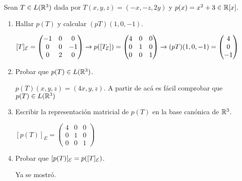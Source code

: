 \item Sean $T\in L(\mathbb{R}^3)$ dada por $T(x,y,z)=(-x,-z,2y)$ y $p(x)=x^2+3\in\mathbb{R}[x]$.
    \begin{enumerate}
        \item Hallar $p(T)$ y calcular $(pT)(1,0,-1)$.
            \begin{mdframed}[style=s]
                \begin{center}
                    $[T]_{\mathcal{E}}=\begin{pmatrix}
                        -1&0&0\\0&0&-1\\0&2&0
                    \end{pmatrix}\to p([T_{\mathcal{E}}])=\begin{pmatrix}
                        4&0&0\\0&1&0\\0&0&1
                    \end{pmatrix}\to (pT)(1,0,-1)=\begin{pmatrix}
                        4\\0\\-1
                    \end{pmatrix}$
                \end{center}
            \end{mdframed}
        \item Probar que $p(T)\in L(\mathbb{R}^3)$.
            \begin{mdframed}[style=s]
                $p(T)(x,y,z)=(4x,y,z)$. A partir de acá es fácil comprobar que $p(T)\in L(\mathbb{R}^3)$
            \end{mdframed}
        \item Escribir la representación matricial de $p(T)$ en la base canónica de $\mathbb{R}^3$.
            \begin{mdframed}[style=s]
                \begin{center}
                    $[p(T)]_E=\begin{pmatrix}
                        4&0&0\\0&1&0\\0&0&1
                    \end{pmatrix}$
                \end{center}
            \end{mdframed}
        \item Probar que $[p(T)]_{\mathcal{E}}=p([T]_{\mathcal{E}})$.
            \begin{mdframed}[style=s]
                Ya se mostró.
            \end{mdframed}
    \end{enumerate}